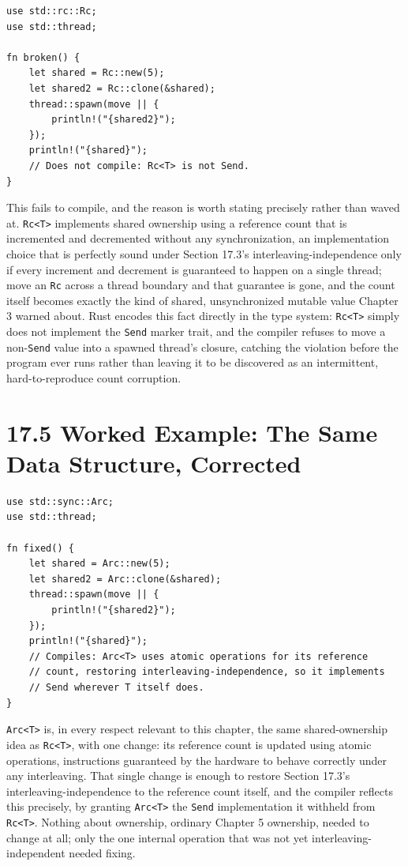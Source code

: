 \documentclass[11pt]{book}
\begin{document}
\begin{lstlisting}
use std::rc::Rc;
use std::thread;

fn broken() {
    let shared = Rc::new(5);
    let shared2 = Rc::clone(&shared);
    thread::spawn(move || {
        println!("{shared2}");
    });
    println!("{shared}");
    // Does not compile: Rc<T> is not Send.
}
\end{lstlisting}

This fails to compile, and the reason is worth stating precisely rather than waved at. \texttt{Rc<T>} implements shared ownership using a reference count that is incremented and decremented without any synchronization, an implementation choice that is perfectly sound under Section 17.3's interleaving-independence only if every increment and decrement is guaranteed to happen on a single thread; move an \texttt{Rc} across a thread boundary and that guarantee is gone, and the count itself becomes exactly the kind of shared, unsynchronized mutable value Chapter 3 warned about. Rust encodes this fact directly in the type system: \texttt{Rc<T>} simply does not implement the \texttt{Send} marker trait, and the compiler refuses to move a non-\texttt{Send} value into a spawned thread's closure, catching the violation before the program ever runs rather than leaving it to be discovered as an intermittent, hard-to-reproduce count corruption.

\section*{17.5 Worked Example: The Same Data Structure, Corrected}

\begin{lstlisting}
use std::sync::Arc;
use std::thread;

fn fixed() {
    let shared = Arc::new(5);
    let shared2 = Arc::clone(&shared);
    thread::spawn(move || {
        println!("{shared2}");
    });
    println!("{shared}");
    // Compiles: Arc<T> uses atomic operations for its reference
    // count, restoring interleaving-independence, so it implements
    // Send wherever T itself does.
}
\end{lstlisting}

\texttt{Arc<T>} is, in every respect relevant to this chapter, the same shared-ownership idea as \texttt{Rc<T>}, with one change: its reference count is updated using atomic operations, instructions guaranteed by the hardware to behave correctly under any interleaving. That single change is enough to restore Section 17.3's interleaving-independence to the reference count itself, and the compiler reflects this precisely, by granting \texttt{Arc<T>} the \texttt{Send} implementation it withheld from \texttt{Rc<T>}. Nothing about ownership, ordinary Chapter 5 ownership, needed to change at all; only the one internal operation that was not yet interleaving-independent needed fixing.
\end{document}
